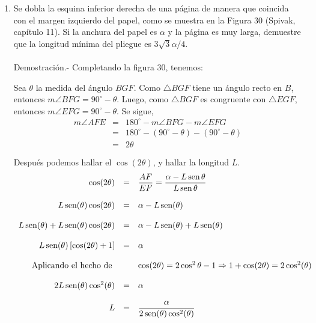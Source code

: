 \begin{enumerate}[\bfseries 1.]
    \item Se dobla la esquina inferior derecha de una página de manera que coincida con el margen izquierdo del papel, como se muestra en la Figura 30 (Spivak, capítulo 11). Si la anchura del papel es $\alpha$ y la página es muy larga, demuestre que la longitud mínima del pliegue es $3\sqrt{3}\alpha/4$.\\\\
	Demostración.-\; Completando la figura 30, tenemos:
	\begin{center}
	    \begin{tikzpicture}[scale=1]
	    \end{tikzpicture}
	\end{center}
	Sea $\theta$ la medida del ángulo $BGF$. Como $\triangle BGF$ tiene un ángulo recto en $B$, entonces $m\angle BFG=90^{\circ}-\theta$. Luego, como $\triangle BGF$ es congruente con $\triangle EGF$, entonces $m\angle EFG=90^{\circ}-\theta.$ Se sigue,
	$$\begin{array}{rcl}
	    m\angle AFE&=&180^{\circ}-m\angle BFG-m\angle EFG\\
		       &=&180^{\circ}-(90^{\circ}-\theta)-(90^{\circ}-\theta)\\
		       &=&2\theta\\\\
	\end{array}$$
	Después podemos hallar el $\cos(2\theta)$, y hallar la longitud $L$.
	$$\begin{array}{rcl}
	    \cos(2\theta)&=&\dfrac{AF}{EF}=\dfrac{\alpha-L\sen \theta}{L\sen \theta}\\\\
			 L\sen(\theta)\cos(2\theta)&=&\alpha-L\sen(\theta)\\\\
			 L\sen(\theta)+L\sen(\theta)\cos(2\theta)&=&\alpha-L\sen(\theta)+L\sen(\theta)\\\\
			 L\sen(\theta)\left[\cos(2\theta)+1\right]&=&\alpha\\\\
			 \mbox{Aplicando el hecho de } && \cos(2\theta)=2\cos^2\theta-1 \Rightarrow 1+\cos(2\theta)=2\cos^2(\theta)\\\\ 
			 2L\sen(\theta)\cos^2(\theta)&=&\alpha\\\\
			 L&=&\dfrac{\alpha}{2\sen(\theta)\cos^2(\theta)}
	\end{array}$$


\end{enumerate}
